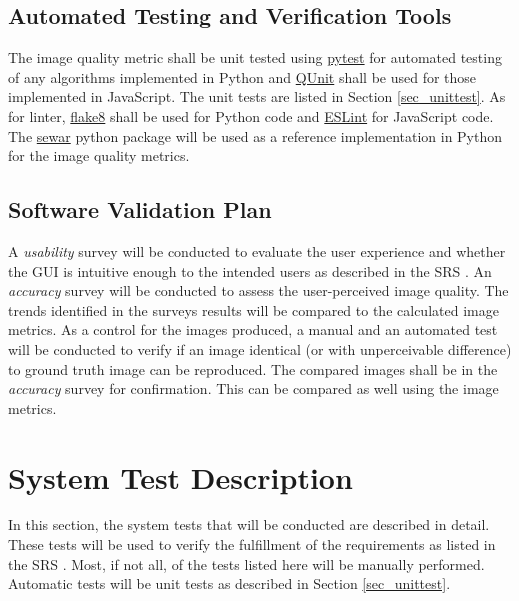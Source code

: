 \documentclass[12pt, titlepage]{article}
\begin{document}
\subsection{Automated Testing and Verification Tools} \label{sec_autotest_tools}

The image quality metric shall be unit tested using \href{https://pytest.org}{pytest} for 
automated testing of any algorithms implemented in Python and \href{https://qunitjs.com}{QUnit} 
shall be used for those implemented in JavaScript. The unit tests are listed in 
Section \ref{sec_unittest}.
As for linter, \href{https://flake8.pycqa.org}{flake8} shall be used for Python code 
and \href{https://eslint.org}{ESLint} for JavaScript code.
The \href{https://github.com/andrewekhalel/sewar}{sewar} python package will be 
used as a reference implementation in Python for the image quality metrics.


\subsection{Software Validation Plan}
A \textit{usability} survey will be conducted to evaluate the user experience and whether 
the GUI is intuitive enough to the intended users as described in the SRS \citep{SRS}.
An \textit{accuracy} survey will be conducted to assess the user-perceived image quality. 
The trends identified in the surveys results will be compared to the calculated image metrics.
As a control for the images produced, a manual and an automated test will be conducted to verify if 
an image identical (or with unperceivable difference) to ground truth image can be reproduced.
The compared images shall be in the \textit{accuracy} survey for confirmation. This can be compared
as well using the image metrics. 


\section{System Test Description} \label{sec_systest_desc}

In this section, the system tests that will be conducted are described in detail. These tests
will be used to verify the fulfillment of the requirements as listed in the SRS \citep{SRS}.
Most, if not all, of the tests listed here will be manually performed. Automatic
tests will be unit tests as described in Section \ref{sec_unittest}.
\end{document}
